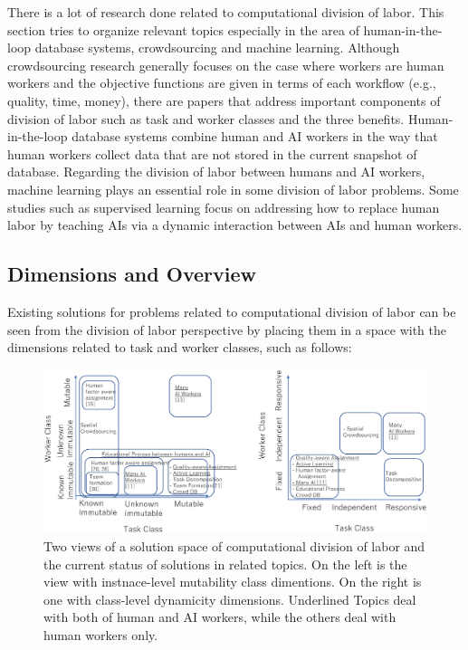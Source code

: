 
There is a lot of research done related to computational division of labor. 
This section tries to organize relevant topics especially in the area of human-in-the-loop database systems, crowdsourcing and machine learning.
Although crowdsourcing research generally focuses on the case where workers are human workers and the objective functions are given in terms of each workflow (e.g., quality, time, money), 
there are papers that address important components of division of labor such as task and worker classes and the three benefits.
Human-in-the-loop database systems combine human and AI workers in the way that human workers collect data that are not stored in the current snapshot of database.
Regarding the division of labor between humans and AI workers, machine learning plays an essential role in some division of labor problems.
Some studies such as supervised learning focus on addressing how to replace human labor by teaching AIs via a dynamic interaction between AIs and human workers.


\subsection{Dimensions and Overview}

Existing solutions for problems related to computational division of labor can be seen from the division of labor perspective by placing them in a space with the dimensions related to task and worker classes, such as follows:\\

\begin{figure}[t]
    \centering
    \includegraphics[width=160mm]{submissions/morishima/figures/dimensions.eps}
    \caption{Two views of a solution space of computational division of labor and the  current status of solutions in related topics. 
    On the left is the view with instnace-level mutability class dimentions.
    On the right is one with class-level dynamicity dimensions.
    Underlined Topics  deal with both of human and AI workers, while the others deal with human workers only.}
    \label{fig:dimensions}
\end{figure}

